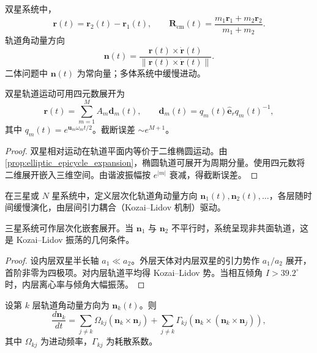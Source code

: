 \begin{definition}[双星系统的相对运动]\label{def:binary_episphere}
双星系统中，
\[
\mathbf r(t)=\mathbf r_2(t)-\mathbf r_1(t),\qquad
\mathbf R_{\text{cm}}(t)=\frac{m_1\mathbf r_1+m_2\mathbf r_2}{m_1+m_2}.
\]
轨道角动量方向
\[
\mathbf n(t)=\frac{\mathbf r(t)\times\dot{\mathbf r}(t)}{\|\mathbf r(t)\times\dot{\mathbf r}(t)\|}.
\]
二体问题中 \(\mathbf n(t)\) 为常向量；多体系统中缓慢进动。
\end{definition}

\begin{proposition}[双星轨道的四元数展开]\label{prop:binary_episphere_approximation}
双星轨道运动可用四元数展开为
\[
\mathbf r(t)=\sum_{m=1}^{M}A_m\mathbf d_m(t),\qquad
\mathbf d_m(t)=q_m(t)\hat{\mathbf e}_r q_m(t)^{-1},
\]
其中 \(q_m(t)=e^{\mathbf u_m\omega_mt/2}\)。截断误差 \(\sim e^{M+1}\)。
\end{proposition}

\begin{proof}
双星相对运动在轨道平面内等价于二维椭圆运动。由 \cref{prop:elliptic_epicycle_expansion}，椭圆轨道可展开为周期分量。使用四元数将二维展开嵌入三维空间。由谐波振幅按 \(e^{|m|}\) 衰减，得截断误差。
\end{proof}

\begin{definition}[多星系统的层次化轨道角动量]\label{def:multiple_star_dynamic_axes}
在三星或 \(N\) 星系统中，定义层次化轨道角动量方向 \(\mathbf n_1(t),\mathbf n_2(t),\dots\)，各层随时间缓慢演化，由层间引力耦合（Kozai--Lidov 机制）驱动。
\end{definition}

\begin{proposition}[多星系统的层次化展开]\label{prop:multiple_star_episphere}
三星系统可作层次化嵌套展开。当 \(\mathbf n_1\) 与 \(\mathbf n_2\) 不平行时，系统呈现非共面轨道，这是 Kozai--Lidov 振荡的几何条件。
\end{proposition}

\begin{proof}
设内层双星半长轴 \(a_1\ll a_2\)。外层天体对内层双星的引力势作 \(a_1/a_2\) 展开，首阶非零为四极项。对内层轨道平均得 Kozai--Lidov 势。当相互倾角 \(I>39.2^\circ\) 时，内层离心率与倾角大幅振荡。
\end{proof}

\begin{theorem}[轨道角动量方向的演化方程]\label{thm:dynamic_axis_evolution}
设第 \(k\) 层轨道角动量方向为 \(\mathbf n_k(t)\)。则
\[
\frac{d\mathbf n_k}{dt}=\sum_{j\neq k}\Omega_{kj}(\mathbf n_k\times\mathbf n_j)
+\sum_{j\neq k}\Gamma_{kj}(\mathbf n_k\times(\mathbf n_k\times\mathbf n_j)),
\]
其中 \(\Omega_{kj}\) 为进动频率，\(\Gamma_{kj}\) 为耗散系数。
\end{theorem}

